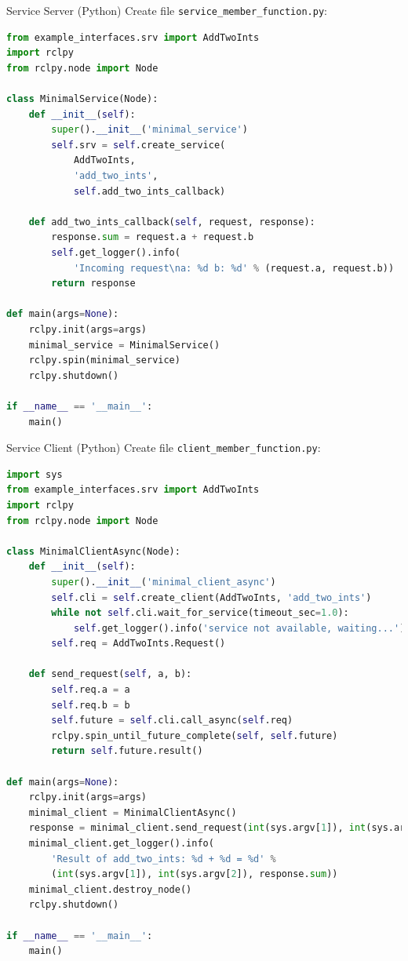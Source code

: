 \begin{frame}{Service Server (Python)}
    Create file \texttt{service\_member\_function.py}:

    \begin{lstlisting}[language=python]
from example_interfaces.srv import AddTwoInts
import rclpy
from rclpy.node import Node

class MinimalService(Node):
    def __init__(self):
        super().__init__('minimal_service')
        self.srv = self.create_service(
            AddTwoInts, 
            'add_two_ints', 
            self.add_two_ints_callback)

    def add_two_ints_callback(self, request, response):
        response.sum = request.a + request.b
        self.get_logger().info(
            'Incoming request\na: %d b: %d' % (request.a, request.b))
        return response

def main(args=None):
    rclpy.init(args=args)
    minimal_service = MinimalService()
    rclpy.spin(minimal_service)
    rclpy.shutdown()

if __name__ == '__main__':
    main()
\end{lstlisting}
\end{frame}

\begin{frame}{Service Client (Python)}
    Create file \texttt{client\_member\_function.py}:

    \begin{lstlisting}[language=python]
import sys
from example_interfaces.srv import AddTwoInts
import rclpy
from rclpy.node import Node

class MinimalClientAsync(Node):
    def __init__(self):
        super().__init__('minimal_client_async')
        self.cli = self.create_client(AddTwoInts, 'add_two_ints')
        while not self.cli.wait_for_service(timeout_sec=1.0):
            self.get_logger().info('service not available, waiting...')
        self.req = AddTwoInts.Request()

    def send_request(self, a, b):
        self.req.a = a
        self.req.b = b
        self.future = self.cli.call_async(self.req)
        rclpy.spin_until_future_complete(self, self.future)
        return self.future.result()

def main(args=None):
    rclpy.init(args=args)
    minimal_client = MinimalClientAsync()
    response = minimal_client.send_request(int(sys.argv[1]), int(sys.argv[2]))
    minimal_client.get_logger().info(
        'Result of add_two_ints: %d + %d = %d' %
        (int(sys.argv[1]), int(sys.argv[2]), response.sum))
    minimal_client.destroy_node()
    rclpy.shutdown()

if __name__ == '__main__':
    main()
\end{lstlisting}
\end{frame}

